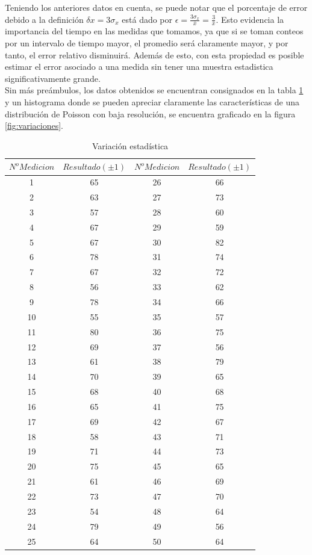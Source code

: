 \documentclass[%
 reprint,
 amsmath,amssymb,
 aps,
]{revtex4-1}
\begin{document}
Teniendo los anteriores datos en cuenta, se puede notar que el porcentaje de error debido a la definición $\delta x = 3\sigma_x$ está dado por $\epsilon = \frac{3\sigma_x}{\bar{x}} = \frac{3}{\bar{x}}$. Esto evidencia la importancia del tiempo en las medidas que tomamos, ya que si se toman conteos por un intervalo de tiempo mayor, el promedio será claramente mayor, y por tanto, el error relativo disminuirá. Además de esto, con esta propiedad es posible estimar el error asociado a una medida sin tener una muestra estadistica significativamente grande.\\


Sin más preámbulos, los datos obtenidos se encuentran consignados en la tabla \ref{table:variaciones} y un histograma donde se pueden apreciar claramente las características de una distribución de Poisson con baja resolución, se encuentra graficado en la figura \ref{fig:variaciones}.\\

\begin{table}[h!]
\centering
\begin{tabular}{|c|c|c|c|}
	\hline $ N^oMedicion $ & $Resultado(\pm 1)$ & $ N^oMedicion $ & $Resultado(\pm 1)$ \\ 
	\hline\hline
	1&65&26&66\\
	2&63&27&73\\
	3&57&28&60\\
	4&67&29&59\\
	5&67&30&82\\
	6&78&31&74\\
	7&67&32&72\\
	8&56&33&62\\
	9&78&34&66\\
	10&55&35&57\\
	11&80&36&75\\
	12&69&37&56\\
	13&61&38&79\\
	14&70&39&65\\
	15&68&40&68\\
	16&65&41&75\\
	17&69&42&67\\
	18&58&43&71\\
	19&71&44&73\\
	20&75&45&65\\
	21&61&46&69\\
	22&73&47&70\\
	23&54&48&64\\
	24&79&49&56\\
	25&64&50&64\\	
		[1ex] 
 \hline
 \end{tabular} 
  \caption{Variación estadística}
\label{table:variaciones} 
\end{table}
\end{document}
